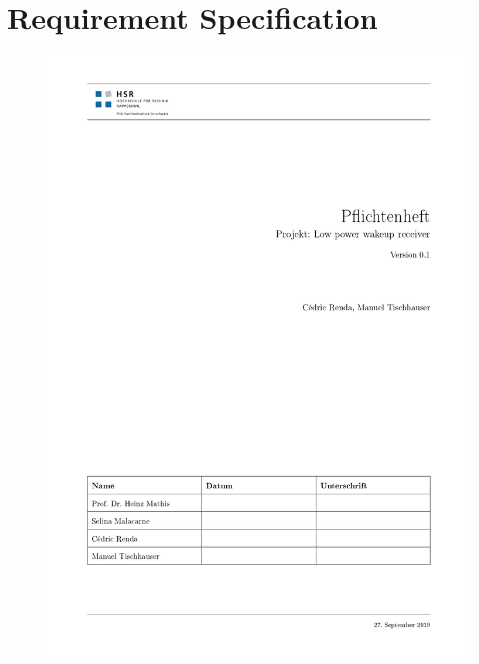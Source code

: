 \section{Requirement Specification}
\begin{figure}[H]
	\centering
	\includegraphics[trim= 0cm 0cm 0cm 0cm,page=1,width=16cm]{../Pflichtenheft/HSR_SRS_main.pdf}
\end{figure}
